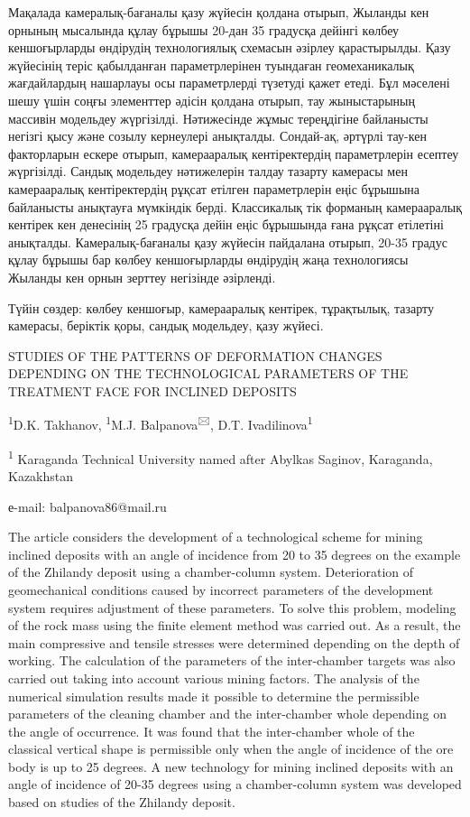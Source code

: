 Мақалада камералық-бағаналы қазу жүйесін қолдана отырып, Жыланды кен
орнының мысалында құлау бұрышы 20-дан 35 градусқа дейінгі көлбеу
кеншоғырларды өндірудің технологиялық схемасын әзірлеу қарастырылды.
Қазу жүйесінің теріс қабылданған параметрлерінен туындаған
геомеханикалық жағдайлардың нашарлауы осы параметрлерді түзетуді қажет
етеді. Бұл мәселені шешу үшін соңғы элементтер әдісін қолдана отырып,
тау жыныстарының массивін модельдеу жүргізілді. Нәтижесінде жұмыс
тереңдігіне байланысты негізгі қысу және созылу кернеулері анықталды.
Сондай-ақ, әртүрлі тау-кен факторларын ескере отырып, камерааралық
кентіректердің параметрлерін есептеу жүргізілді. Сандық модельдеу
нәтижелерін талдау тазарту камерасы мен камерааралық кентіректердің
рұқсат етілген параметрлерін еңіс бұрышына байланысты анықтауға
мүмкіндік берді. Классикалық тік форманың камерааралық кентірек кен
денесінің 25 градусқа дейін еңіс бұрышында ғана рұқсат етілетіні
анықталды. Камералық-бағаналы қазу жүйесін пайдалана отырып, 20-35
градус құлау бұрышы бар көлбеу кеншоғырларды өндірудің жаңа технологиясы
Жыланды кен орнын зерттеу негізінде әзірленді.

Түйін сөздер: көлбеу кеншоғыр, камерааралық кентірек, тұрақтылық,
тазарту камерасы, беріктік қоры, сандық модельдеу, қазу жүйесі.

STUDIES OF THE PATTERNS OF DEFORMATION CHANGES DEPENDING ON THE
TECHNOLOGICAL PARAMETERS OF THE TREATMENT FACE FOR INCLINED DEPOSITS

\textsuperscript{1}D.K. Takhanov, \textsuperscript{1}M.J.
Balpanova\textsuperscript{🖂}, D.T. Ivadilinova\textsuperscript{1}

\textsuperscript{1} Karaganda Technical University named after Abylkas
Saginov, Karaganda, Kazakhstan

е-mail: balpanova86@mail.ru

The article considers the development of a technological scheme for
mining inclined deposits with an angle of incidence from 20 to 35
degrees on the example of the Zhilandy deposit using a chamber-column
system. Deterioration of geomechanical conditions caused by incorrect
parameters of the development system requires adjustment of these
parameters. To solve this problem, modeling of the rock mass using the
finite element method was carried out. As a result, the main compressive
and tensile stresses were determined depending on the depth of working.
The calculation of the parameters of the inter-chamber targets was also
carried out taking into account various mining factors. The analysis of
the numerical simulation results made it possible to determine the
permissible parameters of the cleaning chamber and the inter-chamber
whole depending on the angle of occurrence. It was found that the
inter-chamber whole of the classical vertical shape is permissible only
when the angle of incidence of the ore body is up to 25 degrees. A new
technology for mining inclined deposits with an angle of incidence of
20-35 degrees using a chamber-column system was developed based on
studies of the Zhilandy deposit.

